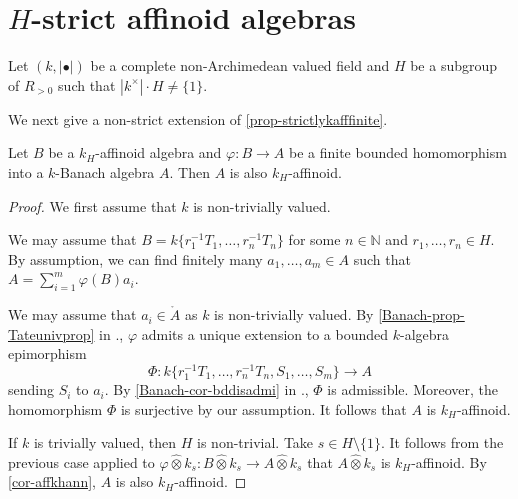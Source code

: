 \section{\texorpdfstring{$H$}{H}-strict affinoid algebras}
Let $(k,|\bullet|)$ be a complete non-Archimedean valued field and $H$ be a subgroup of $R_{>0}$ such that $|k^{\times}|\cdot H\neq \{1\}$.


We next give a non-strict extension of \cref{prop-strictlykafffinite}.
\begin{proposition}\label{prop-strictlykafffinite2}
    Let $B$ be a $k_H$-affinoid algebra and $\varphi:B\rightarrow A$ be a finite bounded homomorphism into a $k$-Banach algebra $A$. Then $A$ is also $k_H$-affinoid.
\end{proposition}
\begin{proof}
    We first assume that $k$ is non-trivially valued.

    We may assume that $B=k\{r_1^{-1}T_1,\ldots,r_n^{-1}T_n\}$ for some $n\in \mathbb{N}$ and $r_1,\ldots,r_n\in H$.
    By assumption, we can find finitely many $a_1,\ldots,a_m\in A$ such that $A=\sum_{i=1}^m \varphi(B)a_i$.

    We may assume that $a_i\in \mathring{A}$ as $k$ is non-trivially valued. By \cref{Banach-prop-Tateunivprop} in ., $\varphi$ admits a unique extension to a bounded $k$-algebra epimorphism 
    \[
        \Phi:  k\{r_1^{-1}T_1,\ldots,r_n^{-1}T_n,S_1,\ldots,S_m\}\rightarrow A
    \]
    sending $S_i$ to $a_i$. By \cref{Banach-cor-bddisadmi} in ., $\Phi$ is admissible. Moreover, the homomorphism $\Phi$ is surjective by our assumption. It follows that $A$ is $k_H$-affinoid.

    If $k$ is trivially valued, then $H$ is non-trivial.
    Take $s\in H \setminus \{1\}$. It follows from the previous case applied to  $\varphi\hat{\otimes}k_s:B \hat{\otimes}k_s\rightarrow A \hat{\otimes}k_s$ that $A \hat{\otimes}k_s$ is $k_H$-affinoid. By \cref{cor-affkhann}, $A$ is also $k_H$-affinoid. 
\end{proof}


